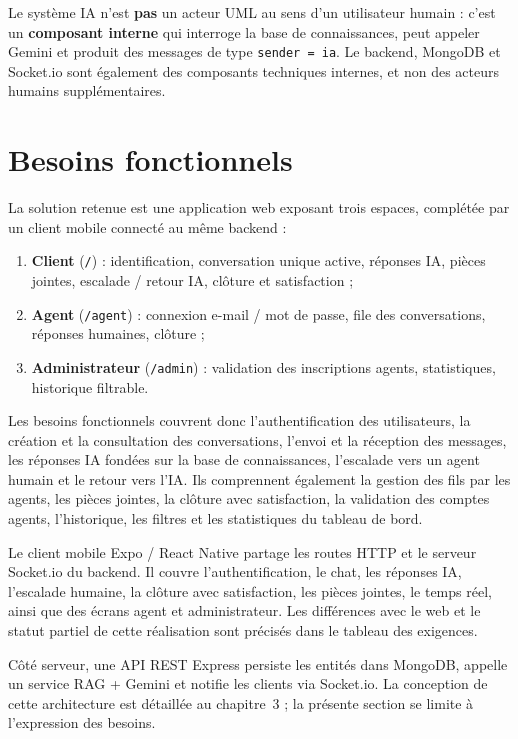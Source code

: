 Le système IA n'est \textbf{pas} un acteur UML au sens d'un utilisateur humain : c'est un \textbf{composant interne} qui interroge la base de connaissances, peut appeler Gemini et produit des messages de type \texttt{sender = ia}. Le backend, MongoDB et Socket.io sont également des composants techniques internes, et non des acteurs humains supplémentaires.

\section{Besoins fonctionnels}

La solution retenue est une application web exposant trois espaces, complétée par un client mobile connecté au même backend :

\begin{enumerate}[leftmargin=1.6em]
  \item \textbf{Client} (\texttt{/}) : identification, conversation unique active, réponses IA, pièces jointes, escalade / retour IA, clôture et satisfaction ;
  \item \textbf{Agent} (\texttt{/agent}) : connexion e-mail / mot de passe, file des conversations, réponses humaines, clôture ;
  \item \textbf{Administrateur} (\texttt{/admin}) : validation des inscriptions agents, statistiques, historique filtrable.
\end{enumerate}

Les besoins fonctionnels couvrent donc l'authentification des utilisateurs, la création et la consultation des conversations, l'envoi et la réception des messages, les réponses IA fondées sur la base de connaissances, l'escalade vers un agent humain et le retour vers l'IA. Ils comprennent également la gestion des fils par les agents, les pièces jointes, la clôture avec satisfaction, la validation des comptes agents, l'historique, les filtres et les statistiques du tableau de bord.

Le client mobile Expo / React Native partage les routes HTTP et le serveur Socket.io du backend. Il couvre l'authentification, le chat, les réponses IA, l'escalade humaine, la clôture avec satisfaction, les pièces jointes, le temps réel, ainsi que des écrans agent et administrateur. Les différences avec le web et le statut partiel de cette réalisation sont précisés dans le tableau des exigences.

Côté serveur, une API REST Express persiste les entités dans MongoDB, appelle un service RAG + Gemini et notifie les clients via Socket.io. La conception de cette architecture est détaillée au chapitre~3 ; la présente section se limite à l'expression des besoins.

